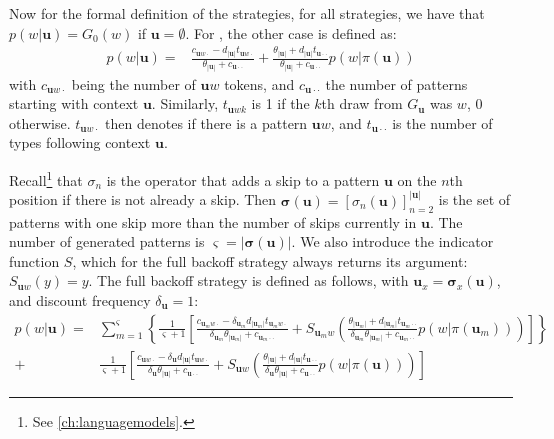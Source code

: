 Now for the formal definition of the strategies, for all strategies, we have that $p(w|\mathbf{u})=G_0(w)$ if $\mathbf{u} = \emptyset$. For \BON, the other case is defined as:
  \begin{equation}\begin{split}
  	p(w|\mathbf{u})= &
\frac{c_{\mathbf{u}w\cdot}-d_{|\mathbf{u}|}t_{\mathbf{u}w\cdot}}{\theta_{|\mathbf{u}|}+c_{\mathbf{u}\cdot\cdot}} +
\frac{\theta_{|\mathbf{u}|}+d_{|\mathbf{u}|}t_{\mathbf{u}\cdot\cdot}}{\theta_{|\mathbf{u}|}+c_{\mathbf{u}\cdot\cdot}}
p(w|\pi(\mathbf{u}))
  \end{split}\end{equation}
with $c_{\mathbf{u}w\cdot}$ being the number of $\mathbf{u}w$ tokens, and $c_{\mathbf{u}\cdot\cdot}$ the number of patterns starting with context $\mathbf{u}$. Similarly, $t_{\mathbf{u}wk}$ is 1 if the $k$th draw from $G_{\mathbf{u}}$ was $w$, 0 otherwise. $t_{\mathbf{u}w\cdot}$ then denotes if there is a pattern $\mathbf{u}w$, and $t_{\mathbf{u}\cdot\cdot}$ is the number of types following context $\mathbf{u}$.
  
Recall\footnote{See \cref{ch:languagemodels}.} that $\sigma_n$ is the operator that adds a skip to a pattern $\mathbf{u}$ on the $n$th position if there is not already a skip. Then $\boldsymbol\sigma(\mathbf{u}) = \left[\sigma_n(\mathbf{u})\right]_{n=2}^{|\mathbf{u}|}$ is the set of patterns with one skip more than the number of skips currently in $\mathbf{u}$. The number of generated patterns is $\boldsymbol\varsigma=|\boldsymbol\sigma(\mathbf{u})|$.
We also introduce the indicator function $S$, which for the {\sf full} backoff strategy always returns its argument: $S_{\mathbf{u}w}(y) = y$.
%
%
The {\sf full} backoff strategy is defined as follows, with $\mathbf{u}_x = \boldsymbol\sigma_x(\mathbf{u})$, and discount frequency $\delta_{\mathbf{u}} = 1$:
 \begin{equation}
 \begin{split}
p(w|\mathbf{u}) =& \sum_{m=1}^{\boldsymbol\varsigma}\left\{ \frac{1}{\mathbf{\boldsymbol\varsigma}+1}\left[
\frac{c_{\mathbf{u}_mw\cdot}-\delta_{\mathbf{u}_m}d_{|\mathbf{u}_m|}t_{\mathbf{u}_mw\cdot}}{\delta_{\mathbf{u}_m}\theta_{|\mathbf{u}_m|}+c_{\mathbf{u}_m\cdot\cdot}} + S_{\mathbf{u}_mw}\left(
\frac{\theta_{|\mathbf{u}_m|}+d_{|\mathbf{u}_m|}t_{\mathbf{u}_m\cdot\cdot}}{\delta_{\mathbf{u}_m}\theta_{|\mathbf{u}_m|}+c_{\mathbf{u}_m\cdot\cdot}}
p(w|\pi(\mathbf{u}_m))\right)\right] \right\} \\ 
+ 
& \frac{1}{\mathbf{\boldsymbol\varsigma}+1}\left[
\frac{c_{\mathbf{u}w\cdot}-\delta_{\mathbf{u}}d_{|\mathbf{u}|}t_{\mathbf{u}w\cdot}}{\delta_{\mathbf{u}}\theta_{|\mathbf{u}|}+c_{\mathbf{u}\cdot\cdot}}+ S_{\mathbf{u}w}\left(\frac{\theta_{|\mathbf{u}|}+d_{|\mathbf{u}|}t_{\mathbf{u}\cdot\cdot}}{\delta_{\mathbf{u}}\theta_{|\mathbf{u}|}+c_{\mathbf{u}\cdot\cdot}}
p(w|\pi(\mathbf{u}))\right)\right]
  \end{split}\end{equation}
 
